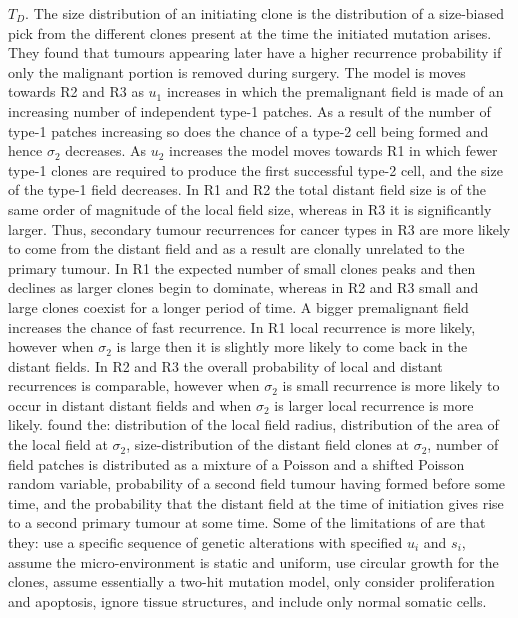 \documentclass[\main/thesis.tex]{subfiles}
\begin{document}
$T_D$. The size distribution of an initiating clone is the distribution of a 
size-biased pick from the different clones present at the time the initiated 
mutation arises. They found that tumours appearing later have a higher recurrence 
probability if only the malignant portion is removed during surgery. The model 
is moves towards R2 and R3 as $u_1$ increases in which the premalignant field is 
made of an increasing number of independent type-1 patches. As a result of the 
number of type-1 patches increasing so does the chance of a type-2 cell being 
formed and hence $\sigma_2$ decreases. As $u_2$ increases the model moves 
towards R1 in which fewer type-1 clones are required to produce the first 
successful type-2 cell, and the size of the type-1 field decreases. In R1 and R2 
the total distant field size is of the same order of magnitude of the local 
field size, whereas in R3 it is significantly larger. Thus, secondary tumour 
recurrences for cancer types in R3 are more likely to come from the distant 
field and as a result are clonally unrelated to the primary tumour. In R1 the 
expected number of small clones peaks and then declines as larger clones begin 
to dominate, whereas in R2 and R3 small and large clones coexist for a longer 
period of time. A bigger premalignant field increases the chance of fast 
recurrence. In R1 local recurrence is more likely, however when 
$\sigma_2$ is large then it is slightly more likely to come back in the distant 
fields. In R2 and R3 the overall probability of local and distant recurrences is 
comparable, however when $\sigma_2$ is small recurrence is more likely to occur 
in distant distant fields and when $\sigma_2$ is larger local recurrence is more 
likely. \textcite{Foo} found the: distribution of the local field radius, 
distribution of the area of the local field at $\sigma_2$, size-distribution of 
the distant field clones at $\sigma_2$, number of field patches is distributed 
as a mixture of a Poisson and a shifted Poisson random variable, probability of 
a second field tumour having formed before some time, and the probability that 
the distant field at the time of initiation gives rise to a second primary 
tumour at some time. Some of the limitations of \textcite{Foo} are that they: 
use a specific sequence of genetic alterations with specified $u_i$ and $s_i$, 
assume the micro-environment is static and uniform, use circular growth for the 
clones, assume essentially a two-hit mutation model, only consider proliferation 
and apoptosis, ignore tissue structures, and include only normal somatic cells. 
\end{document}
